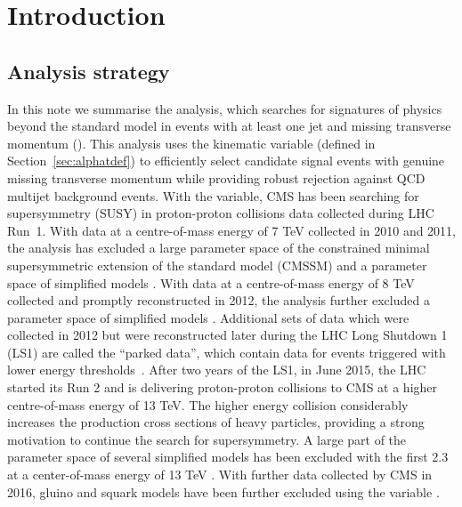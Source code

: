 \section{Introduction}
\label{sec:intro}

\subsection{Analysis strategy}
\label{sec:analysis-strategy}

In this note we summarise the \alphat analysis, which searches for
signatures of physics beyond the standard model in events with at least one jet 
and missing transverse momentum (\met). This analysis uses the
kinematic variable \alphat (defined in Section~\ref{sec:alphatdef}) to efficiently select candidate signal
events with genuine missing transverse momentum while providing robust
rejection against QCD multijet background events. With the \alphat
variable, CMS has been searching for supersymmetry (SUSY) in
proton-proton collisions data collected during LHC Run~1. With data at
a centre-of-mass energy of 7 TeV collected in 2010 and 2011, the
\alphat analysis has excluded a large parameter space of the
constrained minimal supersymmetric extension of the standard model
(CMSSM) \cite{Khachatryan:2011tk, Chatrchyan:2011zy,
Chatrchyan:2012wa} and a parameter space of simplified models
\cite{Chatrchyan:2012wa}. With data at a centre-of-mass energy of 8
TeV collected and promptly reconstructed in 2012, the \alphat analysis
further excluded a parameter space of simplified models
\cite{Chatrchyan:2013lya}. Additional sets of data which were
collected in 2012 but were reconstructed later during the LHC Long
Shutdown 1 (LS1) are called the ``parked data'', which contain data
for events triggered with lower energy
thresholds~\cite{Khachatryan:2016pxa}. 
After two years of the LS1, in June 2015, the LHC started its Run 2 and is
delivering proton-proton collisions to CMS at a higher centre-of-mass
energy of 13 TeV. The higher energy collision considerably increases
the production cross sections of heavy particles, providing a strong
motivation to continue the search for supersymmetry.
A large part of the parameter space of several simplified models has been excluded 
with the first 2.3 \ifb at a center-of-mass energy of 13 TeV \cite{Khachatryan:2016dvc}. 
With further data collected by CMS in 2016, gluino and squark models have 
been further excluded using the \alphat variable \cite{CMS-PAS-SUS-16-016}.

